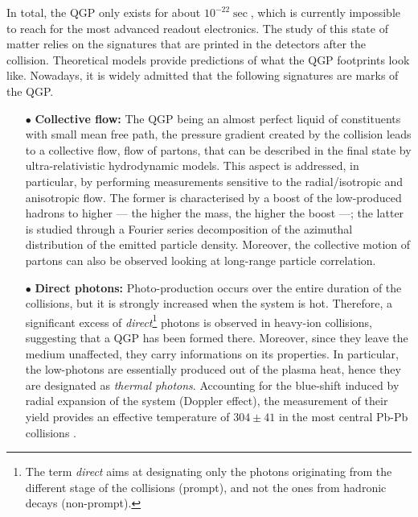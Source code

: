 In total, the QGP only exists for about $10^{-22}\sec$, which is currently impossible to reach for the most advanced readout electronics. The study of this state of matter relies on the signatures that are printed in the detectors after the collision. Theoretical models provide predictions of what the QGP footprints look like. Nowadays, it is widely admitted that the following signatures are marks of the QGP.

\begin{itemize}
\item[$\bullet$] \textbf{Collective flow:} The QGP being an almost perfect liquid of constituents with small mean free path, the pressure gradient created by the collision leads to a collective flow, \ie flow of partons, that can be described in the final state by ultra-relativistic hydrodynamic models.  This aspect is addressed, in particular, by performing measurements sensitive to the radial/isotropic and anisotropic flow. The former is characterised by a boost of the low-\pT produced hadrons to higher \pT --- the higher the mass, the higher the boost ---; the latter is studied through a Fourier series decomposition of the azimuthal distribution of the emitted particle density. Moreover, the collective motion of partons can also be observed looking at long-range particle correlation.\\

\item[$\bullet$] \textbf{Direct photons:} Photo-production occurs over the entire duration of the collisions, but it is strongly increased when the system is hot. Therefore, a significant excess of \textit{direct}\footnote{The term \textit{direct} aims at designating only the photons originating from the different stage of the collisions (prompt), and not the ones from hadronic decays (non-prompt).} photons is observed in heavy-ion collisions, suggesting that a QGP has been formed there. Moreover, since they leave the medium unaffected, they carry informations on its properties. In particular, the low-\pT photons are essentially produced out of the plasma heat, hence they are designated as \textit{thermal photons}. Accounting for the blue-shift induced by radial expansion of the system (Doppler effect), the measurement of their yield provides an effective temperature of $304 \pm 41$ \mev in the most central Pb-Pb collisions \cite{alicecollaborationALICEExperimentJourney2022}.\\


\end{itemize}
